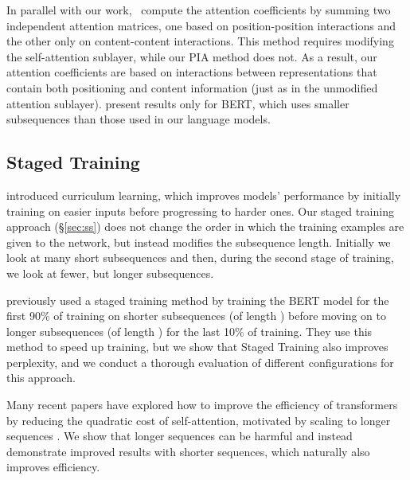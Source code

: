 \documentclass[11pt,a4paper]{article}
\begin{document}
In parallel with our work,~\citet{ke2020rethinking} compute the attention coefficients by summing two independent attention matrices, one based on position-position interactions and the other only on content-content interactions.
This method requires modifying the self-attention sublayer, while our PIA method does not. As a result, our attention coefficients are based on interactions between representations that contain both positioning and content information (just as in the unmodified attention sublayer). \citet{ke2020rethinking} present results only for BERT, which uses smaller subsequences than those used in our language models. 


\subsection{Staged Training}
\citet{CL} introduced curriculum learning, which improves models' performance by initially training on easier inputs before progressing to harder ones. Our staged training approach (\S\ref{sec:ss}) does not change the order in which the training examples are given to the network, but instead modifies the subsequence length. Initially we look at many short subsequences and then, during the second stage of training, we look at fewer, but longer subsequences. 



\citet{bert} previously used a staged training method by training the BERT model for the first 90\% of training on shorter subsequences (of length ) before moving on to longer subsequences (of length ) for the last 10\% of training. They use this method to speed up training, but we show that Staged Training also improves perplexity, and we conduct a thorough evaluation of different configurations for this approach.  

Many recent papers have explored how to improve the efficiency of transformers by reducing the quadratic cost of self-attention, motivated by scaling to longer sequences \cite{kitaev2020reformer, roy2020efficient, tay2020efficient}. We show that longer sequences can be harmful and instead demonstrate improved results with shorter sequences, which naturally also improves efficiency.
\end{document}

